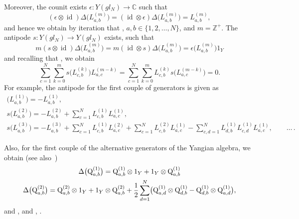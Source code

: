 \documentclass[10pt,a4paper]{amsart}
\numberwithin{equation}{section}
\theoremstyle{definition}
\newcommand{\id}{\operatorname{id}}
\def\mathfrak#1{#1}%
\def\mathcal#1{#1}%
\begin{document}
Moreover, the counit exists $\epsilon\colon {\mathcal Y}(\mathfrak{gl}_{\mathcal N}) \to {\mathbb C}$ such that
\[
(\epsilon \otimes \id)\Delta\bigl(L_{a,b}^{(m)}\bigr) = (\id \otimes \epsilon)\Delta\bigl(L^{(m)}_{a,b}\bigr) = L_{a,b}^{(m)},
\]
and hence we obtain by iteration that , $a,b \in \{1,2,\dots, {\mathcal N}\}$, and $m= {\mathbb Z}^+$.
The antipode $s\colon {\mathcal Y}(\mathfrak{gl}_{\mathcal N})\to {\mathcal Y}(\mathfrak{gl}_{\mathcal N})$ exists, such that
\[
m(s\otimes \id)\Delta\bigl(L_{a,b}^{(m)}\bigr) =m(\id \otimes s)\Delta\bigl(L_{a,b}^{(m)}\bigr)=\epsilon\bigl(L^{(m)}_{a,b}\bigr)1_{\mathcal Y}
\]
and recalling that , we obtain
\begin{equation*}
\sum_{c=1}^{\mathcal N}\sum_{k=0}^{m} s\bigl(L^{(k)}_{c,b}\bigr) L^{(m-k)}_{a,c} =\sum_{c=1}^{\mathcal N}\sum_{k=0}^{m} L^{(k)}_{c,b} s\bigl(L^{(m-k)}_{a,c}\bigr) =0.
\end{equation*}
For example, the antipode for the first couple of generators is given as
\begin{gather*}
 \bigl(L^{(1)}_{a,b}\bigr) = - L_{a,b}^{(1)}, \nonumber\\
 s\bigl(L^{(2)}_{a,b}\bigr) =
 -L^{(2)}_{a,b} +\sum_{c=1}^{\mathcal N}L^{(1)}_{c,b}L^{(1)}_{a,c},\nonumber\\
 s\bigl(L^{(3)}_{a,b}\bigr) =
 -L^{(3)}_{a,b} +\sum_{c=1}^{\mathcal N}L^{(1)}_{c,b}L^{(2)}_{a,c} + \sum_{c=1}^{\mathcal N}L^{(2)}_{c,b}L^{(1)}_{a,c} -\sum_{c,d=1}^{\mathcal N} L^{(1)}_{d,b}L^{(1)}_{c,d}L^{(1)}_{a,c}, \qquad \dots\,. \end{gather*}


Also, for the first couple of the alternative generators of the Yangian algebra, we obtain (see also~\cite{Chari})
\begin{gather*}
\Delta\bigl({\mathrm Q}_{a,b}^{(1)}\bigr) = {\mathrm Q}_{a,b}^{(1)} \otimes 1_{\mathcal Y} + 1_{\mathcal Y}\otimes
{\mathrm Q}_{a,b}^{(1)} \cr
\Delta\bigl({\mathrm Q}_{a,b}^{(2)}\bigr) = {\mathrm Q}_{a,b}^{(2)}
\otimes 1_{\mathcal Y}+ 1_{\mathcal Y}\otimes {\mathrm Q}_{a,b}^{(2)} + \frac{1}{2}
\sum _{d=1}^{\mathcal N}\bigl({\mathrm Q}_{a,d}^{(1)}\otimes
{\mathrm Q}_{d,b}^{(1)}-
{\mathrm Q}_{d,b}^{(1)}\otimes {\mathrm Q}_{a,d}^{(1)}\bigr), %
\end{gather*}
and , and
, .
\end{document}
